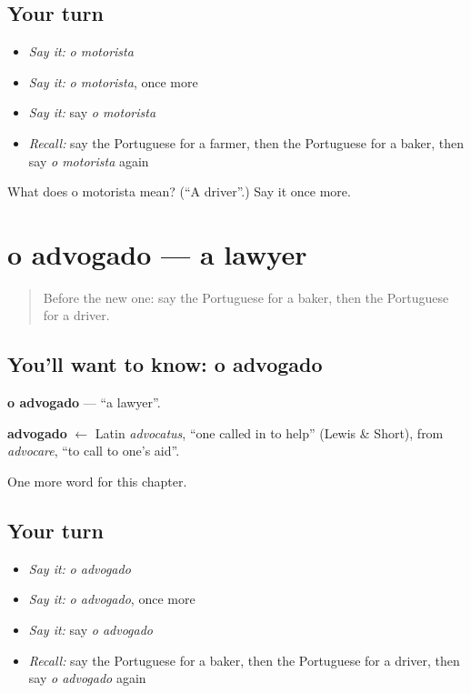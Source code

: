 \subsection*{Your turn}
\begin{itemize}
\raggedright
  \item \emph{Say it:} \emph{o motorista}
  \item \emph{Say it:} \emph{o motorista}, once more
  \item \emph{Say it:} say \emph{o motorista}
  \item \emph{Recall:} say the Portuguese for a farmer, then the Portuguese for a baker, then say \emph{o motorista} again
\end{itemize}

\begin{tcolorbox}[breakable,colback=teal!4,colframe=teal!35!black,title={Before you move on}]
What does o motorista mean? (\textquotedblleft{}A driver\textquotedblright{}.) Say it once more.
\end{tcolorbox}
\section[o advogado]{o advogado — a lawyer}

\label{lesson:PT-C111-advogado}



\begin{quote}
Before the new one: say the Portuguese for a baker, then the Portuguese for a driver.
\end{quote}

\subsection*{You'll want to know: o advogado}
\textbf{o advogado} — \textquotedblleft{}a lawyer\textquotedblright{}.

\begin{cousinweb}
\textbf{advogado} $\leftarrow$ Latin \emph{advocatus}, \textquotedblleft{}one called in to help\textquotedblright{} (Lewis \& Short), from \emph{advocare}, \textquotedblleft{}to call to one's aid\textquotedblright{}.
\end{cousinweb}

\begin{grammarlens}[title={What you've built}]
One more word for this chapter.
\end{grammarlens}

\subsection*{Your turn}
\begin{itemize}
\raggedright
  \item \emph{Say it:} \emph{o advogado}
  \item \emph{Say it:} \emph{o advogado}, once more
  \item \emph{Say it:} say \emph{o advogado}
  \item \emph{Recall:} say the Portuguese for a baker, then the Portuguese for a driver, then say \emph{o advogado} again
\end{itemize}

